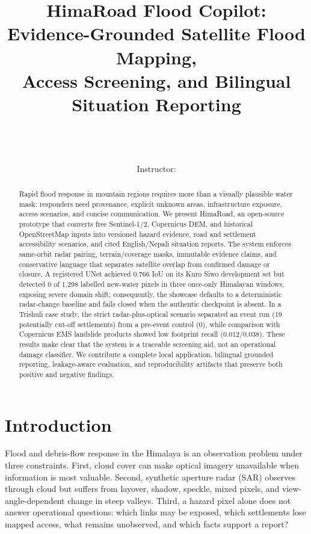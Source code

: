 \documentclass[10pt,twocolumn,letterpaper]{article}
\title{HimaRoad Flood Copilot: Evidence-Grounded Satellite Flood Mapping,\\
Access Screening, and Bilingual Situation Reporting}
\author{\CourseAuthors\\[2pt]
\CourseAffiliation\\
\CourseName\\
Instructor: \CourseInstructor\\
{\tt\small \RepositoryURL}}
\newcommand{\system}{HimaRoad\xspace}
\begin{document}
\maketitle

\begin{abstract}
Rapid flood response in mountain regions requires more than a visually plausible
water mask: responders need provenance, explicit unknown areas, infrastructure
exposure, access scenarios, and concise communication. We present \system, an
open-source prototype that converts free Sentinel-1/2, Copernicus DEM, and
historical OpenStreetMap inputs into versioned hazard evidence, road and
settlement accessibility scenarios, and cited English/Nepali situation reports.
The system enforces same-orbit radar pairing, terrain/coverage masks, immutable
evidence claims, and conservative language that separates satellite overlap from
confirmed damage or closure. A registered UNet achieved 0.766 IoU on its Kuro
Siwo development set but detected 0 of 1,298 labelled new-water pixels in three
once-only Himalayan windows, exposing severe domain shift; consequently, the
showcase defaults to a deterministic radar-change baseline and fails closed when
the authentic checkpoint is absent. In a Trishuli case study, the strict
radar-plus-optical scenario separated an event run (19 potentially cut-off
settlements) from a pre-event control (0), while comparison with Copernicus EMS
landslide products showed low footprint recall (0.012/0.038). These results make
clear that the system is a traceable screening aid, not an operational damage
classifier. We contribute a complete local application, bilingual grounded
reporting, leakage-aware evaluation, and reproducibility artifacts that preserve
both positive and negative findings.
\end{abstract}

\section{Introduction}
Flood and debris-flow response in the Himalaya is an observation problem under
three constraints. First, cloud cover can make optical imagery unavailable when
information is most valuable. Second, synthetic aperture radar (SAR) observes
through cloud but suffers from layover, shadow, speckle, mixed pixels, and
view-angle-dependent change in steep valleys. Third, a hazard pixel alone does
not answer operational questions: which links may be exposed, which settlements
lose mapped access, what remains unobserved, and which facts support a report?
\end{document}
